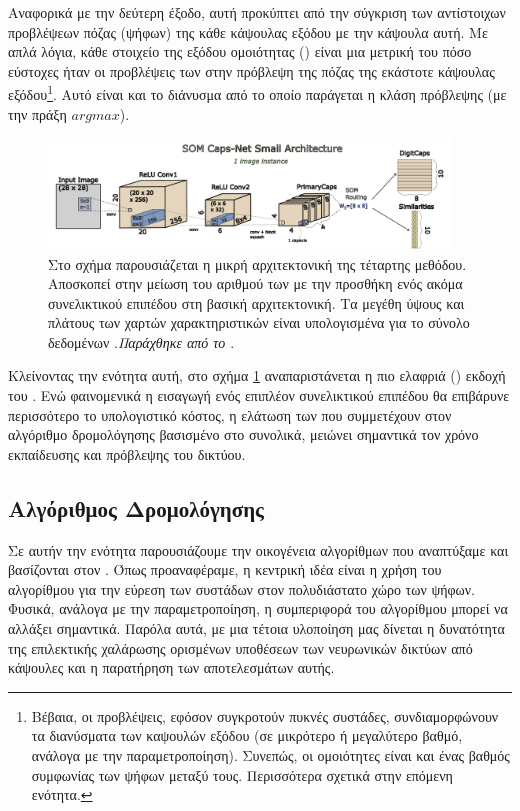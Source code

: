 Αναφορικά με την δεύτερη έξοδο, αυτή προκύπτει από την σύγκριση των αντίστοιχων προβλέψεων πόζας (ψήφων) της κάθε κάψουλας εξόδου με την κάψουλα αυτή. Με απλά λόγια, κάθε στοιχείο της εξόδου ομοιότητας () είναι μια μετρική του πόσο εύστοχες ήταν οι προβλέψεις των  στην πρόβλεψη της πόζας της εκάστοτε κάψουλας εξόδου\footnote{Βέβαια, οι προβλέψεις, εφόσον συγκροτούν πυκνές συστάδες, συν\textendash διαμορφώνουν τα διανύσματα των καψουλών εξόδου (σε μικρότερο ή μεγαλύτερο βαθμό, ανάλογα με την παραμετροποίηση). Συνεπώς, οι ομοιότητες είναι και ένας βαθμός συμφωνίας των ψήφων μεταξύ τους. Περισσότερα σχετικά στην επόμενη ενότητα.}. Αυτό είναι και το διάνυσμα από το οποίο παράγεται η κλάση πρόβλεψης (με την πράξη $argmax$).

\begin{figure}[h]
  \centering
  \includegraphics[width=0.95\textwidth]{images/chapter method/forth_method_architecture_small.pdf}
  \caption{Στο σχήμα παρουσιάζεται η μικρή αρχιτεκτονική της τέταρτης μεθόδου. Αποσκοπεί στην μείωση του αριθμού των  με την προσθήκη ενός ακόμα συνελικτικού επιπέδου στη βασική αρχιτεκτονική. Τα μεγέθη ύψους και πλάτους των χαρτών χαρακτηριστικών είναι υπολογισμένα για το σύνολο δεδομένων .\textit{Παράχθηκε από το \href{https://inkscape.org/}{}}.}
  \label{fig:method_4_architecture_small}
\end{figure}

Κλείνοντας την ενότητα αυτή, στο σχήμα \ref{fig:method_4_architecture_small} αναπαριστάνεται η πιο ελαφριά () εκδοχή του . Ενώ φαινομενικά η εισαγωγή ενός επιπλέον συνελικτικού επιπέδου θα επιβάρυνε περισσότερο το υπολογιστικό κόστος, η ελάτωση των  που συμμετέχουν στον αλγόριθμο δρομολόγησης βασισμένο στο  συνολικά, μειώνει σημαντικά τον χρόνο εκπαίδευσης και πρόβλεψης του δικτύου.


\subsection{Αλγόριθμος Δρομολόγησης}

Σε αυτήν την ενότητα παρουσιάζουμε την οικογένεια αλγορίθμων που αναπτύξαμε και βασίζονται στον . Όπως προαναφέραμε, η κεντρική ιδέα είναι η χρήση του αλγορίθμου για την εύρεση των συστάδων στον πολυδιάστατο χώρο των ψήφων. Φυσικά, ανάλογα με την παραμετροποίηση, η συμπεριφορά του αλγορίθμου μπορεί να αλλάξει σημαντικά. Παρόλα αυτά, με μια τέτοια υλοποίηση μας δίνεται η δυνατότητα της επιλεκτικής χαλάρωσης ορισμένων υποθέσεων των νευρωνικών δικτύων από κάψουλες και η παρατήρηση των αποτελεσμάτων αυτής.\par

